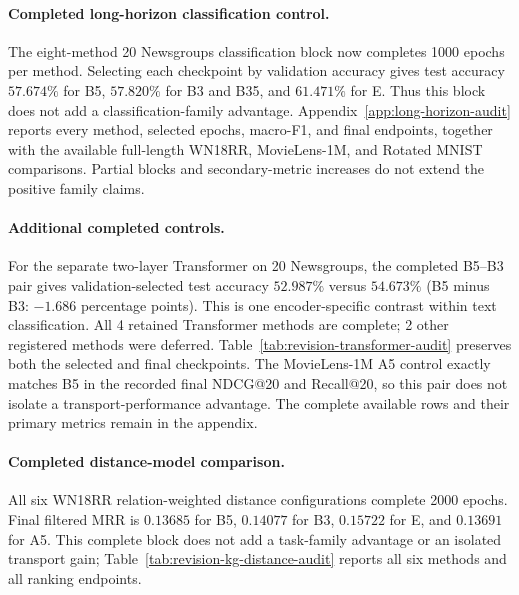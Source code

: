 \paragraph{Completed long-horizon classification control.}
The eight-method 20 Newsgroups classification block now completes 1000 epochs per method. Selecting each checkpoint by validation accuracy gives test accuracy $57.674\%$ for B5, $57.820\%$ for B3 and B35, and $61.471\%$ for E. Thus this block does not add a classification-family advantage. Appendix~\ref{app:long-horizon-audit} reports every method, selected epochs, macro-F1, and final endpoints, together with the available full-length WN18RR, MovieLens-1M, and Rotated MNIST comparisons. Partial blocks and secondary-metric increases do not extend the positive family claims.
\paragraph{Additional completed controls.}
For the separate two-layer Transformer on 20 Newsgroups, the completed B5--B3 pair gives validation-selected test accuracy $52.987\%$ versus $54.673\%$ (B5 minus B3: $-1.686$ percentage points). This is one encoder-specific contrast within text classification. All 4 retained Transformer methods are complete; 2 other registered methods were deferred. Table~\ref{tab:revision-transformer-audit} preserves both the selected and final checkpoints. The MovieLens-1M A5 control exactly matches B5 in the recorded final NDCG@20 and Recall@20, so this pair does not isolate a transport-performance advantage. The complete available rows and their primary metrics remain in the appendix.
\paragraph{Completed distance-model comparison.}
All six WN18RR relation-weighted distance configurations complete 2000 epochs. Final filtered MRR is $0.13685$ for B5, $0.14077$ for B3, $0.15722$ for E, and $0.13691$ for A5. This complete block does not add a task-family advantage or an isolated transport gain; Table~\ref{tab:revision-kg-distance-audit} reports all six methods and all ranking endpoints.
